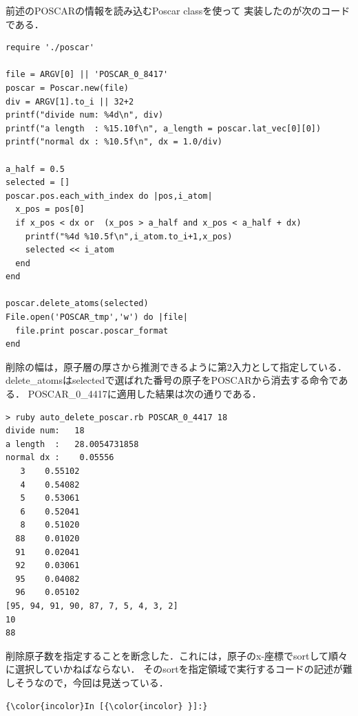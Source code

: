 \documentclass[11pt,dvipdfmx]{jsarticle}
\begin{document}
前述のPOSCARの情報を読み込むPoscar classを使って
実装したのが次のコードである．

\begin{verbatim}
require './poscar'

file = ARGV[0] || 'POSCAR_0_8417'
poscar = Poscar.new(file)
div = ARGV[1].to_i || 32+2
printf("divide num: %4d\n", div)
printf("a length  : %15.10f\n", a_length = poscar.lat_vec[0][0])
printf("normal dx : %10.5f\n", dx = 1.0/div)

a_half = 0.5
selected = []
poscar.pos.each_with_index do |pos,i_atom|
  x_pos = pos[0]
  if x_pos < dx or  (x_pos > a_half and x_pos < a_half + dx)
    printf("%4d %10.5f\n",i_atom.to_i+1,x_pos)
    selected << i_atom
  end
end

poscar.delete_atoms(selected)
File.open('POSCAR_tmp','w') do |file|
  file.print poscar.poscar_format
end
\end{verbatim}

削除の幅は，原子層の厚さから推測できるように第2入力として指定している．
delete\_atomsはselectedで選ばれた番号の原子をPOSCARから消去する命令である．
POSCAR\_0\_4417に適用した結果は次の通りである．

\begin{verbatim}
> ruby auto_delete_poscar.rb POSCAR_0_4417 18
divide num:   18
a length  :   28.0054731858
normal dx :    0.05556
   3    0.55102
   4    0.54082
   5    0.53061
   6    0.52041
   8    0.51020
  88    0.01020
  91    0.02041
  92    0.03061
  95    0.04082
  96    0.05102
[95, 94, 91, 90, 87, 7, 5, 4, 3, 2]
10
88
\end{verbatim}

削除原子数を指定することを断念した．これには，原子のx-座標でsortして順々に選択していかねばならない．
そのsortを指定領域で実行するコードの記述が難しそうなので，今回は見送っている．

    \begin{Verbatim}[commandchars=\\\{\}]
{\color{incolor}In [{\color{incolor} }]:} 
\end{Verbatim}


    
    
    
    
\end{document}

